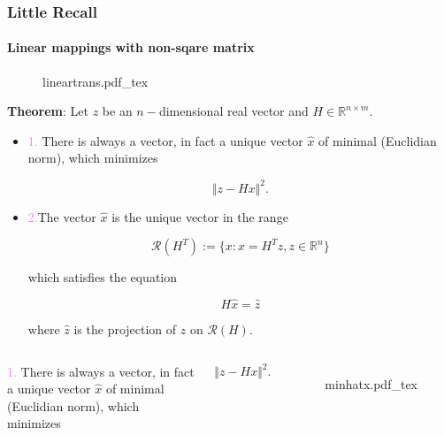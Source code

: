 \documentclass[aspectratio=169]{beamer}
\newcommand{\incfig}[2][1]{%
    \def\svgwidth{#1\columnwidth}
    {#2.pdf_tex} }
\begin{document}
\begin{frame} %
	\frametitle{Little Recall}
	\framesubtitle{Linear mappings with non-sqare matrix}
	
\begin{figure}[ht]
    \centering
    \incfig{lineartrans}
    \label{fig:lineartrans}
\end{figure}

\end{frame}

\begin{frame}{} %
	
{\color{violet} \textbf{Theorem}:} Let $z$ be an $n-$dimensional real vector and $H \in \mathbb{R}^{n \times m}$.\\
	
\begin{itemize}
	\item \textcolor{violet}{1.} There is always a vector, in fact a unique vector $\hat{x}$ of minimal (Euclidian norm), which minimizes

	\[ \Vert z - H x \Vert^2. \]
	
	\item \textcolor{violet}{2.}The vector $\hat{x}$ is the unique vector in the range
		
	\[ \mathcal{R}(H^T) := \{ x : x = H^T z, z\in \mathbb{R}^n  \} \]
	
	\noindent which satisfies the equation
	
	\[ H \hat{x} = \hat{z} \]
	
	\noindent where $\hat{z}$ is the projection of $z$ on $\mathcal{R}(H).$

	\end{itemize}
\end{frame}

\begin{frame} %
	\begin{columns}
	

		\textcolor{violet}{1.} There is always a vector, in fact a unique vector $\hat{x}$ of minimal (Euclidian norm), which minimizes

		\[ \Vert z - H x \Vert^2. \]
		

\begin{figure}[ht]
    \centering
    \incfig{minhatx}
    \label{fig:minhatx}
\end{figure}

	\end{columns}
\end{frame}
\end{document}
